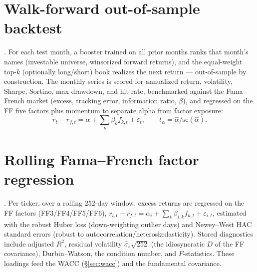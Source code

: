 \documentclass[11pt]{article}
\begin{document}
\section{Walk-forward out-of-sample backtest}
\label{sec:bt}
. For each test month, a booster trained on all
prior months ranks that month's names (investable universe, winsorized forward
returns), and the equal-weight top-$k$ (optionally long/short) book realizes the
next return --- out-of-sample by construction. The monthly series is scored for
annualized return, volatility, Sharpe, Sortino, max drawdown, and hit rate,
benchmarked against the Fama--French market ($\text{excess}$, tracking error,
information ratio, $\beta$), and regressed on the FF five factors plus momentum to
separate alpha from factor exposure:
\begin{equation}
  r_t-r_{f,t}=\alpha+\textstyle\sum_k\beta_k f_{k,t}+\varepsilon_t,\qquad
  t_\alpha=\hat\alpha/\mathrm{se}(\hat\alpha).
\end{equation}

\section{Rolling Fama--French factor regression}
\label{sec:ffreg}
. Per ticker, over a rolling $252$-day
window, excess returns are regressed on the FF factors (FF3/FF4/FF5/FF6),
$r_{i,t}-r_{f,t}=\alpha_i+\sum_k\beta_{i,k}f_{k,t}+\varepsilon_{i,t}$, estimated with
the robust Huber loss (down-weighting outlier days) and Newey--West HAC standard
errors (robust to autocorrelation/heteroskedasticity). Stored diagnostics include
adjusted $R^2$, residual volatility $\hat\sigma_\varepsilon\sqrt{252}$ (the
idiosyncratic $D$ of the FF covariance), Durbin--Watson, the condition number, and
$F$-statistics. These loadings feed the WACC (\S\ref{sec:wacc}) and the fundamental
covariance.
\end{document}
